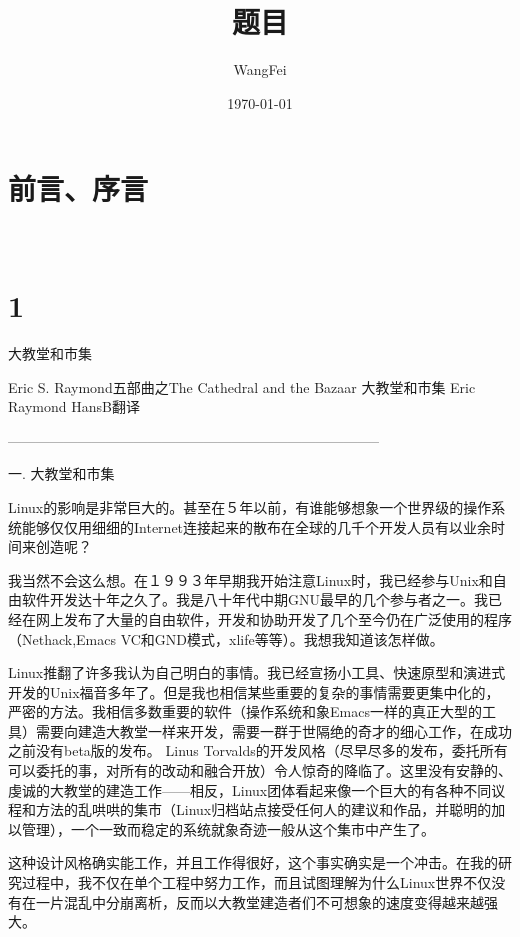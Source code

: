 \documentclass[a4paper,12pt,UTF8,twoside]{ctexbook}
\title{\heiti\zihao{0} 题目}
\author{WangFei}
\date{\today}
\begin{document}
\maketitle
\tableofcontents

\frontmatter
\chapter{前言、序言}

\mainmatter

~\\

 \qquad  

\chapter{1}



大教堂和市集

Eric S. Raymond五部曲之The Cathedral and the Bazaar
大教堂和市集
Eric Raymond
HansB翻译

--------------------------------------------------------------------------------

一. 大教堂和市集


Linux的影响是非常巨大的。甚至在５年以前，有谁能够想象一个世界级的操作系统能够仅仅用细细的Internet连接起来的散布在全球的几千个开发人员有以业余时间来创造呢？

我当然不会这么想。在１９９３年早期我开始注意Linux时，我已经参与Unix和自由软件开发达十年之久了。我是八十年代中期GNU最早的几个参与者之一。我已经在网上发布了大量的自由软件，开发和协助开发了几个至今仍在广泛使用的程序（Nethack,Emacs VC和GND模式，xlife等等）。我想我知道该怎样做。


Linux推翻了许多我认为自己明白的事情。我已经宣扬小工具、快速原型和演进式开发的Unix福音多年了。但是我也相信某些重要的复杂的事情需要更集中化的，严密的方法。我相信多数重要的软件（操作系统和象Emacs一样的真正大型的工具）需要向建造大教堂一样来开发，需要一群于世隔绝的奇才的细心工作，在成功之前没有beta版的发布。
Linus Torvalds的开发风格（尽早尽多的发布，委托所有可以委托的事，对所有的改动和融合开放）令人惊奇的降临了。这里没有安静的、虔诚的大教堂的建造工作——相反，Linux团体看起来像一个巨大的有各种不同议程和方法的乱哄哄的集市（Linux归档站点接受任何人的建议和作品，并聪明的加以管理），一个一致而稳定的系统就象奇迹一般从这个集市中产生了。


这种设计风格确实能工作，并且工作得很好，这个事实确实是一个冲击。在我的研究过程中，我不仅在单个工程中努力工作，而且试图理解为什么Linux世界不仅没有在一片混乱中分崩离析，反而以大教堂建造者们不可想象的速度变得越来越强大。
\end{document}
